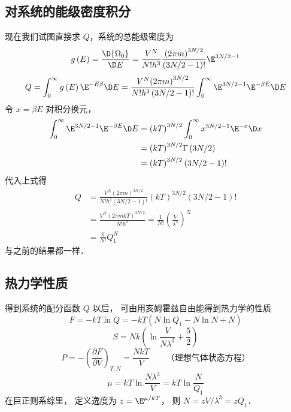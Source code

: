 \subsection{对系统的能级密度积分}
现在我们试图直接求 $Q$，系统的总能级密度为%
\begin{equation}
g\left( E \right) = \frac{{\D {\Omega _0}}}{{\D E}}  = \frac{{{V^N}}}{{N!{h^3}}}\frac{{{{\left( {2\pi m} \right)}^{3N/2}}}}{{\left( {3N/2 - 1} \right)!}}{\E^{3N/2 - 1}}
\end{equation}
\begin{equation}
Q = \int_0^\infty  {g\left( E \right){\E^{ - E\beta }}\D E}  = \frac{{{V^N}{{\left( {2\pi m} \right)}^{3N/2}}}}{{N!{h^3}\left( {3N/2 - 1} \right)!}}\int_0^\infty  {{\E^{3N/2 - 1}}{\E^{ - \beta E}}\D E}
\end{equation}
令 $x = \beta E$ 对积分换元，
\begin{equation}
\begin{aligned}
\int_0^\infty  {{\E^{3N/2 - 1}}{\E^{ - \beta E}}\D E} & = {\left( {kT} \right)^{3N/2}}\int_0^\infty  {{x^{3N/2 - 1}}{\E^{ - x}}\D x}  \\
& = {\left( {kT} \right)^{3N/2}}\Gamma \left( {3N/2} \right) \\
& = {\left( {kT} \right)^{3N/2}}\left( {3N/2 - 1} \right)!
\end{aligned}
\end{equation}
代入上式得
\begin{equation}
\begin{aligned}
Q & = \frac{{{V^N}{{\left( {2\pi m} \right)}^{3N/2}}}}{{N!{h^3}\left( {3N/2 - 1} \right)!}}{\left( {kT} \right)^{3N/2}}(3N/2 - 1)! \\
   & = \frac{{{V^N}{{\left( {2\pi mkT} \right)}^{3N/2}}}}{{N!{h^3}}} = \frac{1}{{N!}}{\left( {\frac{V}{{{\lambda ^3}}}} \right)^N} \\
   & = \frac{1}{{N!}}Q_1^N
 \end{aligned}
 \end{equation}
 与之前的结果都一样．


\subsection{热力学性质}
 得到系统的配分函数 $Q$ 以后， 可由用亥姆霍兹自由能得到热力学的性质
 \begin{equation}
   F =  - kT\ln Q =  - kT\left( {N\ln {Q_1} - N\ln N + N} \right)
 \end{equation}
 \begin{equation}
   S = Nk\left( {\ln \frac{V}{{N{\lambda ^3}}} + \frac{5}{2}} \right)
 \end{equation}
 \begin{equation}
   P =  - {\left( {\frac{{\partial F}}{{\partial V}}} \right)_{T,N}} = \frac{{NkT}}{V} \qquad \text{（理想气体状态方程）}
 \end{equation}
 \begin{equation}
   \mu  = kT\ln \frac{{N{\lambda ^3}}}{V} = kT\ln \frac{N}{{{Q_1}}}
 \end{equation}
 在巨正则系综里， 定义逸度为 $z = {\E^{\mu/kT}}$，  则 $N = {{zV}}/{{{\lambda ^3}}} = z{Q_1}$． 


